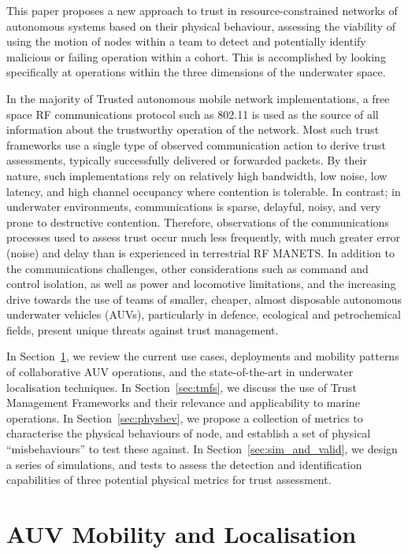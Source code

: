 \documentclass[conference,compsoc,letterpaper]{IEEEtran}
\begin{document}
This paper proposes a new approach to trust in resource-constrained networks of autonomous systems based on their physical behaviour, assessing the viability of using the motion of nodes within a team to detect and potentially identify malicious or failing operation within a cohort.
This is accomplished by looking specifically at operations within the three dimensions of the underwater space.

In the majority of Trusted autonomous mobile network implementations, a free space RF communications protocol such as 802.11 is used as the source of all information about the trustworthy operation of the network.
Most such trust frameworks use a single type of observed communication action to derive trust assessments, typically successfully delivered or forwarded packets. 
By their nature, such implementations rely on relatively high bandwidth, low noise, low latency, and high channel occupancy where contention is tolerable.
In contrast; in underwater environments, communications is sparse, delayful, noisy, and very prone to destructive contention.
Therefore, observations of the communications processes used to assess trust occur much less frequently, with much greater error (noise) and delay than is experienced in terrestrial RF MANETS.
In addition to the communications challenges, other considerations such as command and control isolation, as well as power and locomotive limitations, and the increasing drive towards the use of teams of smaller, cheaper, almost disposable autonomous underwater vehicles (AUVs), particularly in defence, ecological and petrochemical fields, present unique threats against trust management. 

In Section~\ref{sec:mobility}, we review the current use cases, deployments and mobility patterns of collaborative AUV operations, and the state-of-the-art in underwater localisation techniques.
In Section~\ref{sec:tmfs}, we discuss the use of Trust Management Frameworks and their relevance and applicability to marine operations. 
In Section~\ref{sec:physbev}, we propose a collection of metrics to characterise the physical behaviours of node, and establish a set of physical ``misbehaviours'' to test these against.
In Section~\ref{sec:sim_and_valid}, we design a series of simulations, and tests to assess the detection and identification capabilities of three potential physical metrics for trust assessment.


\section{AUV Mobility and Localisation}\label{sec:mobility}
\end{document}
